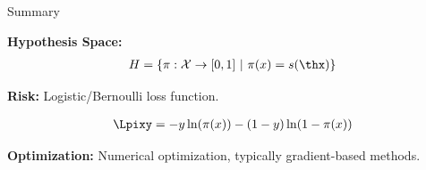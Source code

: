 



 





\begin{frame}{Summary}

\textbf{Hypothesis Space:} 
\begin{eqnarray*}
  \Hspace = \left\{\pi: \Xspace \to [0,1] ~|~\pix = s(\thx) \right\}
\end{eqnarray*}

\lz

\textbf{Risk:} Logistic/Bernoulli loss function.

\begin{eqnarray*}
  \Lpixy = -y\ln(\pix)-(1-y)\ln(1-\pix)
\end{eqnarray*}

\lz


\textbf{Optimization:} Numerical optimization, typically gradient-based methods.




\end{frame}

\endlecture


